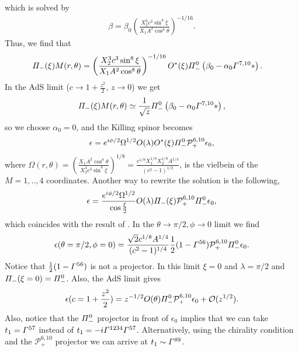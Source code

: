 \documentclass[11pt]{article}
\let\oldGamma=\Gamma
\let\oldPi=\Pi
\renewcommand{\Gamma}{\mathnormal{\oldGamma}}
\renewcommand{\Pi}{\mathnormal{\oldPi}}
\begin{document}
which is solved by
\begin{align}
\beta = \beta_0\left(\frac{X_2^3 c^3 \sin^{8}\xi}{X_1 A^{2} \cos^8\theta}\right)^{-1/16} .
\end{align}
Thus, we find that
\begin{align}
\Pi_-(\xi) M(r,\theta)
& = \left(\frac{X_2^3 c^3 \sin^{8}\xi}{X_1 A^{2} \cos^8\theta}\right)^{-1/16} O^*(\xi)
\Pi_-^0\left(\beta_0  - \alpha_0\Gamma^{7,10}* \right).
\end{align}
In the AdS limit ($c\to 1 + \frac{z^2}{2}$, $z\to 0$) we get
\begin{align}
\Pi_-(\xi) M(r,\theta) \simeq \frac{1}{\sqrt{z}}\Pi_-^0\left(\beta_0  - \alpha_0\Gamma^{7,10}* \right),
\end{align}
so we choose $\alpha_0 = 0$, and the Killing spinor becomes
\begin{align}
\epsilon = e^{i\phi/2}\Omega^{1/2} O(\lambda)O^*(\xi)
\Pi_-^0 \mathcal{P}_+^{6,10}\epsilon_0,
\end{align}
where $\Omega(r,\theta) = \left(\frac{X_1 A^{2} \cos^8\theta}{X_2^3 c^3 \sin^{8}\xi}\right)^{1/8} = \frac{c^{1/8}X_1^{1/8}X_2^{1/8} A^{1/4} }{(c^2-1)^{1/2}}$, is the vielbein of the $M=1,..,4$ coordinates.
Another way to rewrite the solution is the following,
\begin{align}
\epsilon = \frac{e^{i\phi/2}\Omega^{1/2}}{\cos\frac{\xi}{2}}O(\lambda)
\Pi_-(\xi)
\mathcal{P}_+^{6,10}\Pi^0_-\epsilon_0,
\end{align}
which coincides with the result of \cite{Pilch:2003jg}.
In the $\theta\to\pi/2, \phi \to 0$ limit we find
\begin{align}
\epsilon(\theta=\pi/2,\phi=0) = \frac{\sqrt{2}c^{1/8}A^{1/4}}{(c^2-1)^{1/4}}
\frac{1}{2}(1-\Gamma^{56})\mathcal{P}_+^{6,10}\Pi^0_-\epsilon_0.
\end{align}
Notice that $\frac{1}{2}(1-\Gamma^{56})$ is not a projector. In this limit $\xi = 0$ and $\lambda = \pi/2$ and $\Pi_-(\xi=0) = \Pi_-^0$.
Also, the AdS limit gives
\begin{align}
\epsilon(c = 1 + \frac{z^2}{2}) = z^{-1/2}O(\theta)\Pi_-^0 \mathcal{P}_+^{6,10}\epsilon_0 + \mathcal{O}(z^{1/2}).
\end{align}
Also, notice that the $\Pi_-^0$ projector in front of $\epsilon_0$ implies that we can take $t_1 = \Gamma^{57}$ instead of $t_1 = -i\Gamma^{1234}\Gamma^{57}$. Alternatively, using the chirality condition and the $\mathcal{P}_+^{6,10}$ projector we can arrive at $t_1 \sim \Gamma^{89}$.
\end{document}
